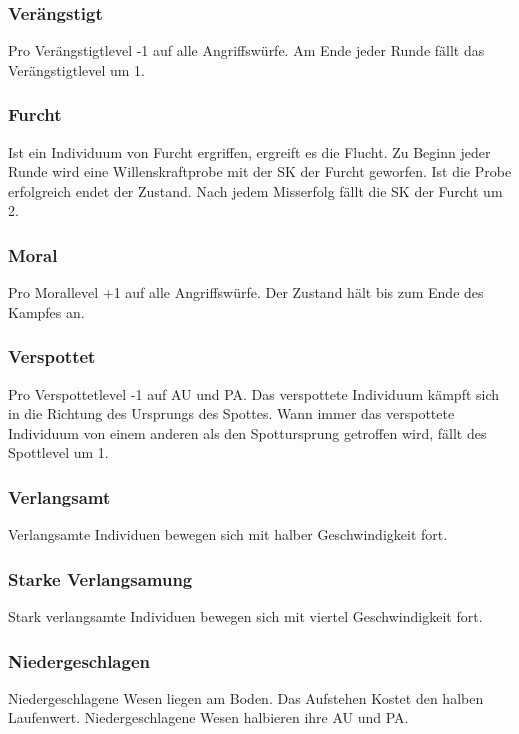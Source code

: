 \documentclass[../../Heldenanleitung2]{subfiles}
\begin{document}
\subsubsection{Verängstigt}
Pro Verängstigtlevel -1 auf alle Angriffswürfe. Am Ende jeder Runde fällt das Verängstigtlevel um 1.

\subsubsection{Furcht}
Ist ein Individuum von Furcht ergriffen, ergreift es die Flucht. Zu Beginn jeder Runde wird eine Willenskraftprobe mit der SK der Furcht geworfen. Ist die Probe erfolgreich endet der Zustand. Nach jedem Misserfolg fällt die SK der Furcht um 2.

\subsubsection{Moral}
Pro Morallevel +1 auf alle Angriffswürfe. Der Zustand hält bis zum Ende des Kampfes an.

\subsubsection{Verspottet}
Pro Verspottetlevel -1 auf AU und PA. Das verspottete Individuum kämpft sich in die Richtung des Ursprungs des Spottes. Wann immer das verspottete Individuum von einem anderen als den Spottursprung getroffen wird, fällt des Spottlevel um 1.

\subsubsection{Verlangsamt}
Verlangsamte Individuen bewegen sich mit halber Geschwindigkeit fort.

\subsubsection{Starke Verlangsamung}
Stark verlangsamte Individuen bewegen sich mit viertel Geschwindigkeit fort.

\subsubsection{Niedergeschlagen}
Niedergeschlagene Wesen liegen am Boden. Das Aufstehen Kostet den halben Laufenwert. Niedergeschlagene Wesen halbieren ihre AU und PA.
\end{document}
